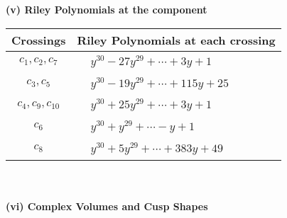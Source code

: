 \documentclass[1p]{elsarticle_modified}
\theoremstyle{definition}
\begin{document}
\newpage\renewcommand{\arraystretch}{1}
\flushleft \textbf{(v) Riley Polynomials at the component}\newline \\
\begin{tabular}{m{50pt}|m{274pt}}
Crossings & \hspace{64pt}Riley Polynomials at each crossing \\
\hline $$\begin{aligned}c_{1},c_{2},c_{7}\end{aligned}$$&$\begin{aligned}
&y^{30}-27 y^{29}+\cdots+3 y+1
\end{aligned}$\\
\hline $$\begin{aligned}c_{3},c_{5}\end{aligned}$$&$\begin{aligned}
&y^{30}-19 y^{29}+\cdots+115 y+25
\end{aligned}$\\
\hline $$\begin{aligned}c_{4},c_{9},c_{10}\end{aligned}$$&$\begin{aligned}
&y^{30}+25 y^{29}+\cdots+3 y+1
\end{aligned}$\\
\hline $$\begin{aligned}c_{6}\end{aligned}$$&$\begin{aligned}
&y^{30}+y^{29}+\cdots- y+1
\end{aligned}$\\
\hline $$\begin{aligned}c_{8}\end{aligned}$$&$\begin{aligned}
&y^{30}+5 y^{29}+\cdots+383 y+49
\end{aligned}$\\
\hline
\end{tabular}\\~\\
\newpage\flushleft \textbf{(vi) Complex Volumes and Cusp Shapes}
\end{document}

